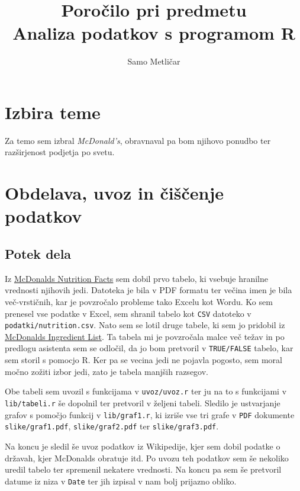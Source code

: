 \documentclass[11pt,a4paper]{article}
\begin{document}
\title{Poročilo pri predmetu \\
Analiza podatkov s programom R}
\author{Samo Metličar}
\maketitle

\newpage
\section{Izbira teme}

Za temo sem izbral \textit{McDonald's}, obravnaval pa bom njihovo ponudbo ter raz\-šir\-je\-nost podjetja po svetu.

\section{Obdelava, uvoz in čiščenje podatkov}

\subsection{Potek dela}

Iz \href{http://nutrition.mcdonalds.com/getnutrition/nutritionfacts.pdf}{McDonalds Nutrition Facts} sem dobil prvo tabelo, ki vsebuje hranilne vrednosti njihovih jedi. Datoteka je bila v PDF formatu ter večina imen je bila več-vrstičnih, kar je povzročalo probleme tako Excelu kot Wordu. Ko sem prenesel vse podatke v Excel, sem shranil tabelo kot \verb|CSV| datoteko v \verb|podatki/nutrition.csv|. Nato sem se lotil druge tabele, ki sem jo pridobil iz \href{http://nutrition.mcdonalds.com/getnutrition/ingredientslist.pdf}{McDonalds Ingredient List}. Ta tabela mi je povzročala malce več težav in po predlogu asistenta sem se odločil, da jo bom pretvoril v \verb|TRUE/FALSE| tabelo, kar sem storil s pomocjo R. Ker pa se vecina jedi ne pojavla pogosto, sem moral močno zožiti izbor jedi, zato je tabela manjših razsegov. \par

Obe tabeli sem uvozil s funkcijama v \verb|uvoz/uvoz.r| ter ju na to s funkcijami v \verb|lib/tabeli.r| še dopolnil ter pretvoril v željeni tabeli. Sledilo je ustvarjanje grafov s pomočjo funkcij v \verb|lib/graf1.r|, ki izriše vse tri grafe v \verb|PDF| dokumente \verb|slike/graf1.pdf|, \verb|slike/graf2.pdf| ter \verb|slike/graf3.pdf|. \par

Na koncu je sledil še uvoz podatkov iz Wikipedije, kjer sem dobil podatke o državah, kjer McDonalds obratuje itd. Po uvozu teh podatkov sem še nekoliko uredil tabelo ter spremenil nekatere vrednosti. Na koncu pa sem še pretvoril datume iz niza v \verb|Date| ter jih izpisal v nam bolj prijazno obliko.
\end{document}
